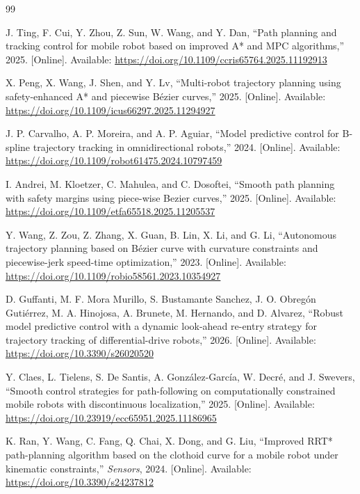 \begin{thebibliography}{99}


J. Ting, F. Cui, Y. Zhou, Z. Sun, W. Wang, and Y. Dan, ``Path planning and tracking control for mobile robot based on improved A* and MPC algorithms,'' 2025. [Online]. Available: \url{https://doi.org/10.1109/ccris65764.2025.11192913}

X. Peng, X. Wang, J. Shen, and Y. Lv, ``Multi-robot trajectory planning using safety-enhanced A* and piecewise Bézier curves,'' 2025. [Online]. Available: \url{https://doi.org/10.1109/icus66297.2025.11294927}

J. P. Carvalho, A. P. Moreira, and A. P. Aguiar, ``Model predictive control for B-spline trajectory tracking in omnidirectional robots,'' 2024. [Online]. Available: \url{https://doi.org/10.1109/robot61475.2024.10797459}

I. Andrei, M. Kloetzer, C. Mahulea, and C. Dosoftei, ``Smooth path planning with safety margins using piece-wise Bezier curves,'' 2025. [Online]. Available: \url{https://doi.org/10.1109/etfa65518.2025.11205537}

Y. Wang, Z. Zou, Z. Zhang, X. Guan, B. Lin, X. Li, and G. Li, ``Autonomous trajectory planning based on Bézier curve with curvature constraints and piecewise-jerk speed-time optimization,'' 2023. [Online]. Available: \url{https://doi.org/10.1109/robio58561.2023.10354927}

D. Guffanti, M. F. Mora Murillo, S. Bustamante Sanchez, J. O. Obregón Gutiérrez, M. A. Hinojosa, A. Brunete, M. Hernando, and D. Alvarez, ``Robust model predictive control with a dynamic look-ahead re-entry strategy for trajectory tracking of differential-drive robots,'' 2026. [Online]. Available: \url{https://doi.org/10.3390/s26020520}

Y. Claes, L. Tielens, S. De Santis, A. González-García, W. Decré, and J. Swevers, ``Smooth control strategies for path-following on computationally constrained mobile robots with discontinuous localization,'' 2025. [Online]. Available: \url{https://doi.org/10.23919/ecc65951.2025.11186965}

K. Ran, Y. Wang, C. Fang, Q. Chai, X. Dong, and G. Liu, ``Improved RRT* path-planning algorithm based on the clothoid curve for a mobile robot under kinematic constraints,'' \emph{Sensors}, 2024. [Online]. Available: \url{https://doi.org/10.3390/s24237812}


\end{thebibliography}
